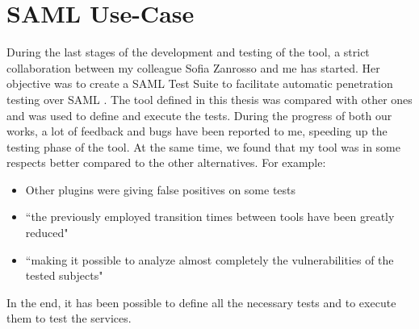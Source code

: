 \section{SAML Use-Case}
During the last stages of the development and testing of the tool, a strict collaboration between my colleague Sofia Zanrosso and me has started. Her objective was to create a \gls{SAML} Test Suite to facilitate automatic penetration testing over \gls{SAML} \cite{sofia_zanrosso}. The tool defined in this thesis was compared with other ones and was used to define and execute the tests. During the progress of both our works, a lot of feedback and bugs have been reported to me, speeding up the testing phase of the tool. At the same time, we found that my tool was in some respects better compared to the other alternatives. For example:
\begin{itemize}
    \item Other plugins were giving false positives on some tests
    \item ``the previously employed transition times between tools have been greatly reduced"
    \item ``making it possible to analyze almost completely the vulnerabilities of the tested subjects"
\end{itemize}
In the end, it has been possible to define all the necessary tests and to execute them to test the services.






